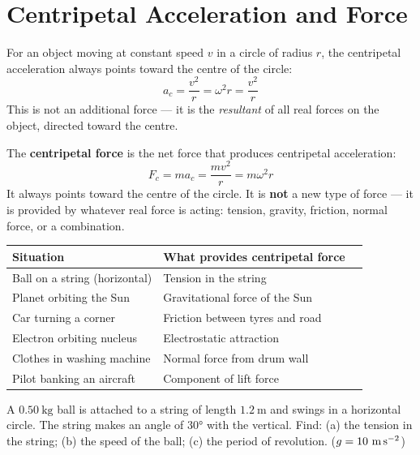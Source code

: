 \section{Centripetal Acceleration and Force}

\begin{lawbox}
For an object moving at constant speed $v$ in a
circle of radius $r$, the centripetal acceleration
always points toward the centre of the circle:
\[
  a_c = \frac{v^2}{r} = \omega^2 r = \frac{v^2}{r}
\]
This is not an additional force --- it is the
\textit{resultant} of all real forces on the object,
directed toward the centre.
\end{lawbox}

\begin{lawbox}
The \textbf{centripetal force} is the net force that
produces centripetal acceleration:
\[
  F_c = ma_c = \frac{mv^2}{r} = m\omega^2 r
\]
It always points toward the centre of the circle.
It is \textbf{not} a new type of force --- it is
provided by whatever real force is acting: tension,
gravity, friction, normal force, or a combination.
\end{lawbox}

\begin{center}
\begin{tabular}{lll}
\toprule
\textbf{Situation} & \textbf{What provides centripetal force}\\
\midrule
Ball on a string (horizontal) & Tension in the string\\
Planet orbiting the Sun & Gravitational force of the Sun\\
Car turning a corner & Friction between tyres and road\\
Electron orbiting nucleus & Electrostatic attraction\\
Clothes in washing machine & Normal force from drum wall\\
Pilot banking an aircraft & Component of lift force\\
\bottomrule
\end{tabular}
\end{center}

\begin{examplebox}[6.2]
A $0.50\ \text{kg}$ ball is attached to a string of
length $1.2\ \text{m}$ and swings in a horizontal
circle. The string makes an angle of $30°$ with the
vertical. Find: (a) the tension in the string;
(b) the speed of the ball; (c) the period of revolution.
($g = 10\ \text{m\,s}^{-2}$)
\end{examplebox}

